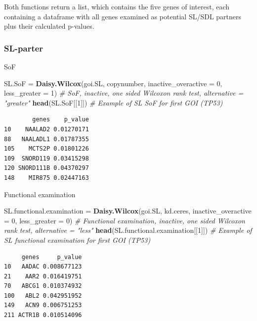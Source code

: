 \documentclass[]{article}
\newenvironment{Shaded}{\begin{snugshade}}{\end{snugshade}}
\newcommand{\KeywordTok}[1]{\textcolor[rgb]{0.13,0.29,0.53}{\textbf{#1}}}
\newcommand{\DataTypeTok}[1]{\textcolor[rgb]{0.13,0.29,0.53}{#1}}
\newcommand{\DecValTok}[1]{\textcolor[rgb]{0.00,0.00,0.81}{#1}}
\newcommand{\StringTok}[1]{\textcolor[rgb]{0.31,0.60,0.02}{#1}}
\newcommand{\CommentTok}[1]{\textcolor[rgb]{0.56,0.35,0.01}{\textit{#1}}}
\newcommand{\NormalTok}[1]{#1}
\begin{document}
Both functions return a list, which contains the five genes of interest,
each containing a dataframe with all genes examined as potential SL/SDL
partners plus their calculated p-values.

\subsubsection{SL-parter}\label{sl-parter}

SoF

\begin{Shaded}
\begin{Highlighting}[]
\NormalTok{SL.SoF =}\StringTok{ }\KeywordTok{Daisy.Wilcox}\NormalTok{(goi.SL, copynumber, }\DataTypeTok{inactive_overactive =} \DecValTok{0}\NormalTok{, }\DataTypeTok{less_greater =} \DecValTok{1}\NormalTok{) }\CommentTok{# SoF, inactive, one sided Wilcoxon rank test, alternative = "greater"}
\KeywordTok{head}\NormalTok{(SL.SoF[[}\DecValTok{1}\NormalTok{]]) }\CommentTok{# Example of SL SoF for first GOI (TP53)}
\end{Highlighting}
\end{Shaded}

\begin{verbatim}
        genes    p_value
10    NAALAD2 0.01270171
88   NAALADL1 0.01787355
105    MCTS2P 0.01801226
109  SNORD119 0.03415298
120 SNORD111B 0.04370297
148    MIR875 0.02447163
\end{verbatim}

Functional examination

\begin{Shaded}
\begin{Highlighting}[]
\NormalTok{SL.functional.examination =}\StringTok{ }\KeywordTok{Daisy.Wilcox}\NormalTok{(goi.SL, kd.ceres, }\DataTypeTok{inactive_overactive =} \DecValTok{0}\NormalTok{, }\DataTypeTok{less_greater =} \DecValTok{0}\NormalTok{) }\CommentTok{# Functional examination, inactive, one sided Wilcoxon rank test, alternative = "less"}
\KeywordTok{head}\NormalTok{(SL.functional.examination[[}\DecValTok{1}\NormalTok{]]) }\CommentTok{# Example of SL functional examination for first GOI (TP53)}
\end{Highlighting}
\end{Shaded}

\begin{verbatim}
     genes     p_value
10   AADAC 0.008677123
21    AAR2 0.016419751
70   ABCG1 0.010374932
100   ABL2 0.042951952
149   ACN9 0.006751253
211 ACTR1B 0.010514096
\end{verbatim}
\end{document}
